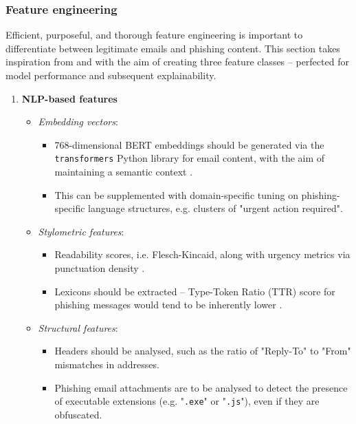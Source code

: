 
\subsubsection*{Feature engineering}
Efficient, purposeful, and thorough feature engineering is important to differentiate between legitimate emails and phishing content. This section takes inspiration from \citep{do2024integrated} and \citep{hamid2013using} with the aim of creating three feature classes -- perfected for model performance and subsequent explainability.

\begin{enumerate}
  \item \textbf{NLP-based features}
  \begin{itemize}
    \item \textit{Embedding vectors}:
    \begin{itemize}
      \item 768-dimensional BERT embeddings should be generated via the \texttt{transformers} Python library for email content, with the aim of maintaining a semantic context \citep{shirazi2022towards}.
      \item This can be supplemented with domain-specific tuning on phishing-specific language structures, e.g. clusters of "urgent action required".
    \end{itemize}
    \item \textit{Stylometric features}:
    \begin{itemize}
      \item Readability scores, i.e. Flesch-Kincaid, along with urgency metrics via punctuation density \citep{greco2023explaining}.
      \item Lexicons should be extracted -- Type-Token Ratio (TTR) score for phishing messages would tend to be inherently lower \citep{anderson2015polymorphic}.
    \end{itemize}
    \item \textit{Structural features}:
    \begin{itemize}
      \item Headers should be analysed, such as the ratio of "Reply-To" to "From" mismatches in addresses. 
      \item Phishing email attachments are to be analysed to detect the presence of executable extensions (e.g. "\texttt{.exe}" or "\texttt{.js}"), even if they are obfuscated.

\end{itemize}
\end{itemize}
\end{enumerate}
